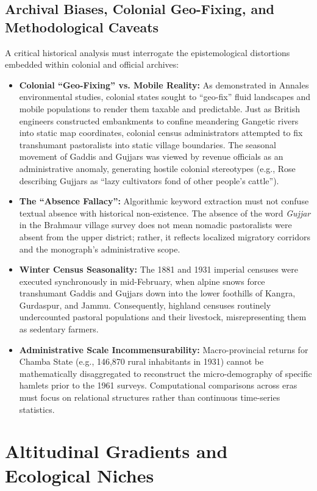 \documentclass[11pt,a4paper]{article}
\begin{document}
\subsection{Archival Biases, Colonial Geo-Fixing, and Methodological Caveats}
A critical historical analysis must interrogate the epistemological distortions embedded within colonial and official archives:
\begin{itemize}[leftmargin=*]
    \item \textbf{Colonial ``Geo-Fixing'' vs. Mobile Reality:} As demonstrated in Annales environmental studies, colonial states sought to ``geo-fix'' fluid landscapes and mobile populations to render them taxable and predictable. Just as British engineers constructed embankments to confine meandering Gangetic rivers into static map coordinates, colonial census administrators attempted to fix transhumant pastoralists into static village boundaries. The seasonal movement of Gaddis and Gujjars was viewed by revenue officials as an administrative anomaly, generating hostile colonial stereotypes (e.g., Rose describing Gujjars as ``lazy cultivators fond of other people's cattle'').
    \item \textbf{The ``Absence Fallacy'':} Algorithmic keyword extraction must not confuse textual absence with historical non-existence. The absence of the word \textit{Gujjar} in the Brahmaur village survey does not mean nomadic pastoralists were absent from the upper district; rather, it reflects localized migratory corridors and the monograph's administrative scope.
    \item \textbf{Winter Census Seasonality:} The 1881 and 1931 imperial censuses were executed synchronously in mid-February, when alpine snows force transhumant Gaddis and Gujjars down into the lower foothills of Kangra, Gurdaspur, and Jammu. Consequently, highland censuses routinely undercounted pastoral populations and their livestock, misrepresenting them as sedentary farmers.
    \item \textbf{Administrative Scale Incommensurability:} Macro-provincial returns for Chamba State (e.g., 146,870 rural inhabitants in 1931) cannot be mathematically disaggregated to reconstruct the micro-demography of specific hamlets prior to the 1961 surveys. Computational comparisons across eras must focus on relational structures rather than continuous time-series statistics.
\end{itemize}

\section{Altitudinal Gradients and Ecological Niches}
\end{document}

